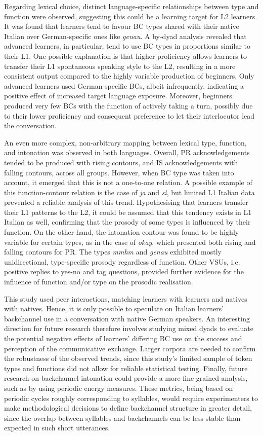 Regarding lexical choice, distinct language-specific relationships between type and function were observed, suggesting this could be a learning target for L2 learners. It was found that learners tend to favour BC types shared with their native Italian over German-specific ones like \textit{genau}. A by-dyad analysis revealed that advanced learners, in particular, tend to use BC types in proportions similar to their L1. One possible explanation is that higher proficiency allows learners to transfer their L1 spontaneous speaking style to the L2, resulting in a more consistent output compared to the highly variable production of beginners. Only advanced learners used German-specific BCs, albeit infrequently, indicating a positive effect of increased target language exposure. Moreover, beginners produced very few BCs with the function of actively taking a turn, possibly due to their lower proficiency and consequent preference to let their interlocutor lead the conversation.

An even more complex, non-arbitrary mapping between lexical type, function, and intonation was observed in both languages. Overall, PR acknowledgements tended to be produced with rising contours, and IS acknowledgements with falling contours, across all groups. However, when BC type was taken into account, it emerged that this is not a one-to-one relation. A possible example of this function-contour relation is the case of \textit{ja} and \textit{sì}, but limited L1 Italian data prevented a reliable analysis of this trend. Hypothesising that learners transfer their L1 patterns to the L2, it could be assumed that this tendency exists in L1 Italian as well, confirming that the prosody of some types is influenced by their function. On the other hand, the intonation contour was found to be highly variable for certain types, as in the case of \textit{okay}, which presented both rising and falling contours for PR. The types \textit{mmhm} and \textit{genau} exhibited mostly unidirectional, type-specific prosody regardless of function. Other VSUs, i.e. positive replies to yes-no and tag questions, provided further evidence for the influence of function and/or type on the prosodic realisation.

This study used peer interactions, matching learners with learners and natives with natives. Hence, it is only possible to speculate on Italian learners’ backchannel use in a conversation with native German speakers. An interesting direction for future research therefore involves studying mixed dyads to evaluate the potential negative effects of learners’ differing BC use on the success and perception of the communicative exchange. Larger corpora are needed to confirm the robustness of the observed trends, since this study’s limited sample of token types and functions did not allow for reliable statistical testing. Finally, future research on backchannel intonation could provide a more fine-grained analysis, such as by using periodic energy measures. These metrics, being based on periodic cycles roughly corresponding to syllables, would require experimenters to make methodological decisions to define backchannel structure in greater detail, since the overlap between syllables and backchannels can be less stable than expected in such short utterances.


